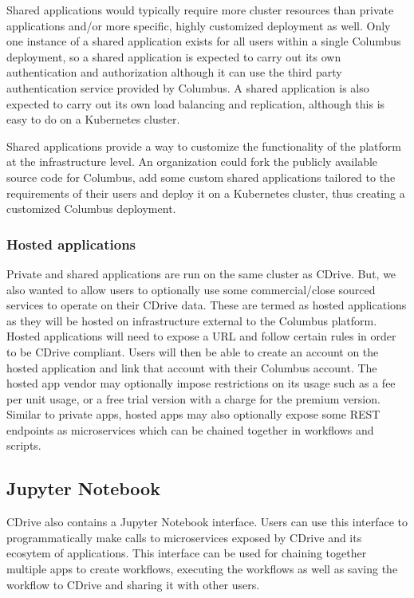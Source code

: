 Shared applications would typically
require more cluster resources than private applications and/or more specific, highly customized 
deployment as well. Only one instance of a shared application exists for all users within a single
Columbus deployment, so a shared application is expected to carry out its own authentication and
authorization although it can use the third party authentication service provided by Columbus. A 
shared application is also expected to carry out its own load balancing and replication, although
this is easy to do on a Kubernetes cluster. 


Shared applications provide a way to customize the functionality of the platform at the
infrastructure level. An organization could fork the publicly available source code for Columbus,
add some custom shared applications tailored to the requirements of their users and deploy it on
a Kubernetes cluster, thus creating a customized Columbus deployment.

\subsubsection{Hosted applications}
Private and shared applications are run on the same cluster as CDrive. But, we also wanted to 
allow users to optionally use some commercial/close sourced services to operate on their CDrive
data. These are termed as hosted applications as they will be hosted on infrastructure external to
the Columbus platform. Hosted applications will need to expose a URL and follow certain rules in
order to be CDrive compliant. Users will then be able to create an account on the hosted application
and link that account with their Columbus account. The hosted app vendor may optionally impose 
restrictions on its usage such as a fee per unit usage, or a free trial version with a charge for
the premium version. Similar to private apps, hosted apps may also optionally expose some REST 
endpoints as microservices which can be chained together in workflows and scripts.

\subsection{Jupyter Notebook}
CDrive also contains a Jupyter Notebook interface. Users can use this interface to 
programmatically make calls to microservices exposed by CDrive and its ecosytem of applications.
This interface can be used for chaining together multiple apps to create workflows, executing the
workflows as well as saving the workflow to CDrive and sharing it with other users.
